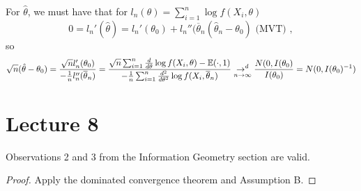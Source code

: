 \documentclass[a4paper]{article}
\begin{document}
\begin{idea}[p=1]
	For $\hat{\theta}$, we must have that for $l_n(\theta) = \sum_{i=1}^{n} \log f(X_i, \theta)$
	\[
		0 = l_{n}' (\hat{\theta}) = l_{n}' (\theta_0) + l _{n}''(\overline{\theta}_n (\hat{\theta}_n - \theta_0) \text{ (MVT) }
	,\]
	so
	\[
		\sqrt{n} (\hat{\theta} - \theta_0) = \frac{\sqrt{n} l_{n}' (\theta_0)}{- \frac{1}{n} l_{n}''(\overline{\theta}_n)} = \frac{\sqrt{n} \sum_{i=1}^{n} \frac{d}{d\theta} \log f(X_i, \theta) - \mathbb{E}(\cdot , 1) }{- \frac{1}{n} \sum_{i=1}^{n} \frac{d^2}{d\theta ^2} \log f(X_i, \overline{\theta}_n)} \underset{n\to \infty}{\to^{d}}  \frac{N(0, I(\theta_0)}{I(\theta_0)} = N(0, I(\theta_0)^{-1})
	\] 
\end{idea}

\section*{Lecture 8}
		
\begin{lemma}
	Observations 2 and 3 from the Information Geometry section are valid.		
\end{lemma}
	
\begin{proof}
	Apply the dominated convergence theorem and Assumption B.
\end{proof}
\end{document}
